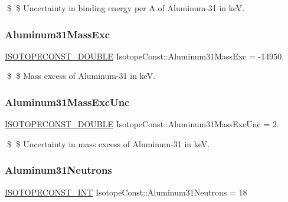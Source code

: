 \$ \$ Uncertainty in binding energy per A of Aluminum-\/31 in keV. \mbox{\label{group___isotope_const-_aluminum-_al31_ga7560511e2f5bba60ffecc9b698e2791d}} 
\subsubsection{\texorpdfstring{Aluminum31\+Mass\+Exc}{Aluminum31MassExc}}
{\footnotesize\ttfamily \mbox{\hyperlink{group___isotope_const-_macros_ga8f45a7272ce02c0b4c65c44636ed719a}{I\+S\+O\+T\+O\+P\+E\+C\+O\+N\+S\+T\+\_\+\+D\+O\+U\+B\+LE}} Isotope\+Const\+::\+Aluminum31\+Mass\+Exc = -\/14950.}

\$ \$ Mass excess of Aluminum-\/31 in keV. \mbox{\label{group___isotope_const-_aluminum-_al31_gaf10f4f255bf390999770b47f554b31aa}} 
\subsubsection{\texorpdfstring{Aluminum31\+Mass\+Exc\+Unc}{Aluminum31MassExcUnc}}
{\footnotesize\ttfamily \mbox{\hyperlink{group___isotope_const-_macros_ga8f45a7272ce02c0b4c65c44636ed719a}{I\+S\+O\+T\+O\+P\+E\+C\+O\+N\+S\+T\+\_\+\+D\+O\+U\+B\+LE}} Isotope\+Const\+::\+Aluminum31\+Mass\+Exc\+Unc = 2.}

\$ \$ Uncertainty in mass excess of Aluminum-\/31 in keV. \mbox{\label{group___isotope_const-_aluminum-_al31_ga6e9962d73f31a67100a8aa404f2e4ec9}} 
\subsubsection{\texorpdfstring{Aluminum31\+Neutrons}{Aluminum31Neutrons}}
{\footnotesize\ttfamily \mbox{\hyperlink{group___isotope_const-_macros_ga5f18360b3e99483a35c32d789e62621c}{I\+S\+O\+T\+O\+P\+E\+C\+O\+N\+S\+T\+\_\+\+I\+NT}} Isotope\+Const\+::\+Aluminum31\+Neutrons = 18}


